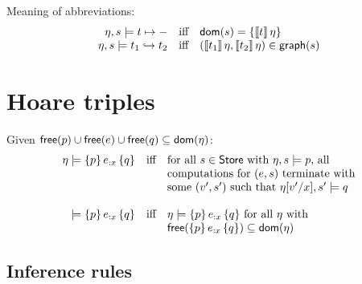 \documentclass[12pt,a4paper]{article}
\begin{document}
Meaning of abbreviations:
\[\begin{array}{rcl}
  \eta,s \models t \mapsto -
  &\text{iff}& \mathsf{dom}(s) = \{\llbracket t\rrbracket\,\eta\} \\
  \eta,s \models t_1 \hookrightarrow t_2
  &\text{iff}& (\llbracket t_1\rrbracket\,\eta,\llbracket t_2\rrbracket\,\eta)\in\mathsf{graph}(s)
\end{array}\]


\section{Hoare triples}

\noindent Given $\mathsf{free}(p)\cup\mathsf{free}(e)\cup\mathsf{free}(q) \subseteq \mathsf{dom}(\eta)$:
\[\begin{array}{rcl}
  \eta \models \{p\}\,e_{:x}\,\{q\}
  &\text{iff}&
  \text{for all $s\in\mathsf{Store}$ with $\eta,s \models p$, all} \\
  && \text{computations for $(e,s)$ terminate with} \\
  && \text{some $(v',s')$ such that $\eta[v'/x],s' \models q$} \\
  \\
  \models \{p\}\,e_{:x}\,\{q\}
  &\text{iff}&
  \eta \models \{p\}\,e_{:x}\,\{q\} \text{ for all $\eta$ with } \\
  && \mathsf{free}(\{p\}\,e_{:x}\,\{q\}) \subseteq \mathsf{dom}(\eta)
\end{array}\]


\subsection{Inference rules}
\end{document}
